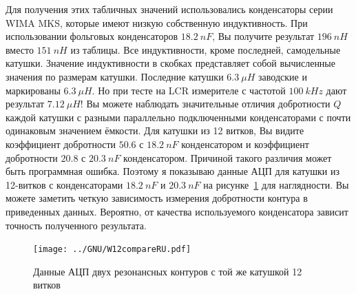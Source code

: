 Для получения этих табличных значений использовались конденсаторы серии WIMA MKS, которые 
имеют низкую собственную индуктивность.
При использовании фольговых конденсаторов \(18.2~nF\), Вы получите  результат \(196~nH\)
вместо \(151~nH\) из таблицы.
Все индуктивности, кроме последней, самодельные катушки.
Значение индуктивности в скобках представляет собой вычисленные значения по размерам катушки.
Последние катушки \(6.3~\mu H\) заводские и маркированы \(6.3~\mu H\).
Но при тесте на LCR измерителе с частотой \(100~kHz\) дают результат \(7.12~\mu H\)!
Вы можете наблюдать значительные отличия добротности \(Q\) каждой катушки с разными параллельно
подключенными конденсаторами с почти одинаковым значением ёмкости.
Для катушки из 12 витков, Вы видите коэффициент добротности \(50.6\) с \(18.2~nF\)
конденсатором и коэффициент добротности \(20.8\) с \(20.3~nF\) конденсатором.
Причиной такого различия может быть программная ошибка.
Поэтому я показываю данные АЦП для катушки из 12-витков с конденсаторами \(18.2~nF\) 
и \(20.3~nF\) на рисунке~\ref{fig:W12compare} для наглядности.
Вы можете заметить четкую зависимость измерения добротности контура в приведенных данных.
Вероятно, от качества используемого конденсатора зависит точность полученного результата.


\begin{figure}[H]
\centering
\texttt{[image: ../GNU/W12compareRU.pdf]}
\caption{Данные АЦП двух резонансных контуров с той же катушкой 12 витков}
\label{fig:W12compare}
\end{figure}
